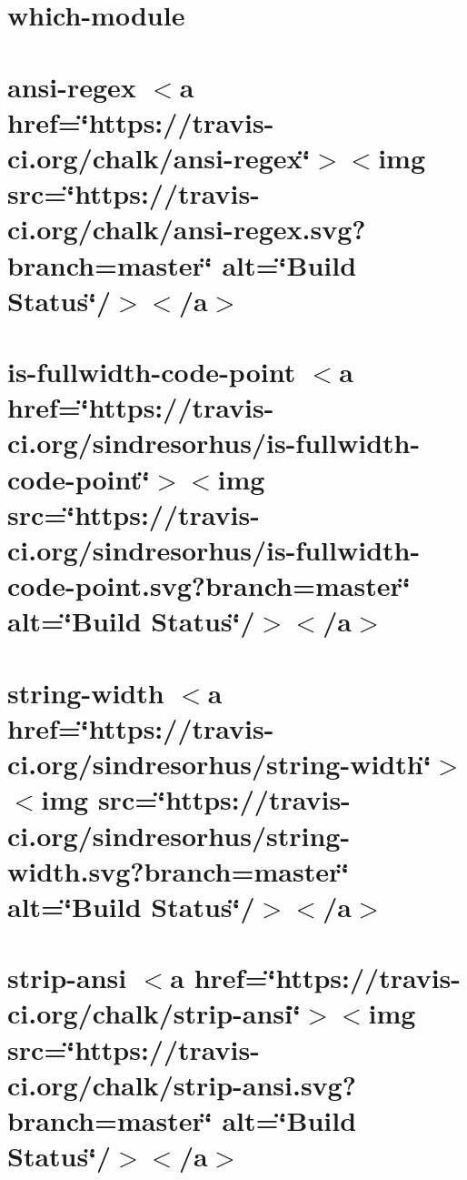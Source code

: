 \let\mypdfximage\pdfximage\def\pdfximage{\immediate\mypdfximage}\documentclass[twoside]{book}
\newcommand{\+}{\discretionary{\mbox{\scriptsize$\hookleftarrow$}}{}{}}
\begin{document}
\chapter{which-\/module}
\label{md_heap-visualizer_node_modules_which-module__r_e_a_d_m_e}

\chapter{ansi-\/regex $<$a href=\char`\"{}https\+://travis-\/ci.\+org/chalk/ansi-\/regex\char`\"{}$>$$<$img src=\char`\"{}https\+://travis-\/ci.\+org/chalk/ansi-\/regex.\+svg?branch=master\char`\"{} alt=\char`\"{}\+Build Status\char`\"{}/$>$$<$/a$>$}
\label{md_heap-visualizer_node_modules_wide-align_node_modules_ansi-regex_readme}

\chapter{is-\/fullwidth-\/code-\/point $<$a href=\char`\"{}https\+://travis-\/ci.\+org/sindresorhus/is-\/fullwidth-\/code-\/point\char`\"{}$>$$<$img src=\char`\"{}https\+://travis-\/ci.\+org/sindresorhus/is-\/fullwidth-\/code-\/point.\+svg?branch=master\char`\"{} alt=\char`\"{}\+Build Status\char`\"{}/$>$$<$/a$>$}
\label{md_heap-visualizer_node_modules_wide-align_node_modules_is-fullwidth-code-point_readme}

\chapter{string-\/width $<$a href=\char`\"{}https\+://travis-\/ci.\+org/sindresorhus/string-\/width\char`\"{}$>$$<$img src=\char`\"{}https\+://travis-\/ci.\+org/sindresorhus/string-\/width.\+svg?branch=master\char`\"{} alt=\char`\"{}\+Build Status\char`\"{}/$>$$<$/a$>$}
\label{md_heap-visualizer_node_modules_wide-align_node_modules_string-width_readme}

\chapter{strip-\/ansi $<$a href=\char`\"{}https\+://travis-\/ci.\+org/chalk/strip-\/ansi\char`\"{}$>$$<$img src=\char`\"{}https\+://travis-\/ci.\+org/chalk/strip-\/ansi.\+svg?branch=master\char`\"{} alt=\char`\"{}\+Build Status\char`\"{}/$>$$<$/a$>$}
\label{md_heap-visualizer_node_modules_wide-align_node_modules_strip-ansi_readme}

\end{document}
